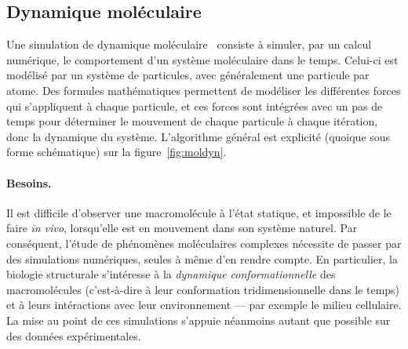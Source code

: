 	\subsection{Dynamique moléculaire}
	Une simulation de dynamique moléculaire~\cite{fermi1955alamos, alder1959studies, rahman1964correlations, gibson1960dynamics, lennard1924determination} consiste à simuler, par un calcul numérique, le comportement d'un système moléculaire dans le temps. Celui-ci est modélisé par un système de particules, avec généralement une particule par atome. Des formules mathématiques permettent de modéliser les différentes forces qui s'appliquent à chaque particule, et ces forces sont intégrées avec un pas de temps pour déterminer le mouvement de chaque particule à chaque itération, donc la dynamique du système. L'algorithme général est explicité (quoique sous forme schématique) sur la figure~\ref{fig:moldyn}.
	
	\paragraph{Besoins.} Il est difficile d'observer une macromolécule à l'état statique, et impossible de le faire \emph{in vivo}, lorsqu'elle est en mouvement dans son système naturel. Par conséquent, l'étude de phénomènes moléculaires complexes nécessite de passer par des simulations numériques, seules à même d'en rendre compte. En particulier, la biologie structurale s'intéresse à la \emph{dynamique conformationnelle} des macromolécules (c'est-à-dire à leur conformation tridimensionnelle dans le temps) et à leurs intéractions avec leur environnement --- par exemple le milieu cellulaire. La mise au point de ces simulations s'appuie néanmoins autant que possible sur des données expérimentales.
	
